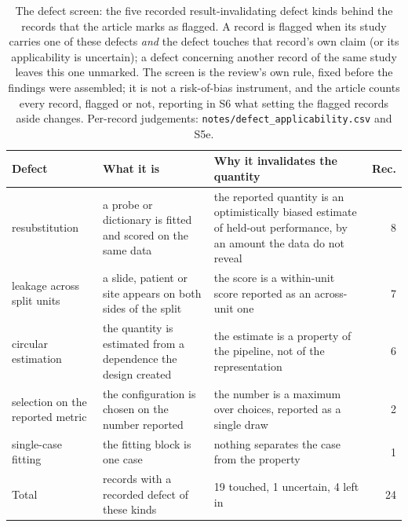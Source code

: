 \begin{table}[!t]
\centering\footnotesize\setlength\tabcolsep{3pt}\renewcommand{\arraystretch}{1.08}
\caption{The defect screen: the five recorded result-invalidating defect kinds behind the records that the article marks as flagged. A record is flagged when its study carries one of these defects \emph{and} the defect touches that record's own claim (or its applicability is uncertain); a defect concerning another record of the same study leaves this one unmarked. The screen is the review's own rule, fixed before the findings were assembled; it is not a risk-of-bias instrument, and the article counts every record, flagged or not, reporting in S6 what setting the flagged records aside changes. Per-record judgements: \texttt{notes/defect\_applicability.csv} and S5e.}
\label{tab:defects}
\begin{tabular}{@{}L{1.9cm}L{2.4cm}L{2.0cm}r@{}}
\toprule
Defect & What it is & Why it invalidates the quantity & Rec. \\
\midrule
resubstitution & a probe or dictionary is fitted and scored on the same data & the reported quantity is an optimistically biased estimate of held-out performance, by an amount the data do not reveal & 8 \\
leakage across split units & a slide, patient or site appears on both sides of the split & the score is a within-unit score reported as an across-unit one & 7 \\
circular estimation & the quantity is estimated from a dependence the design created & the estimate is a property of the pipeline, not of the representation & 6 \\
selection on the reported metric & the configuration is chosen on the number reported & the number is a maximum over choices, reported as a single draw & 2 \\
single-case fitting & the fitting block is one case & nothing separates the case from the property & 1 \\
\midrule
Total & records with a recorded defect of these kinds & 19 touched, 1 uncertain, 4 left in & 24 \\
\bottomrule
\end{tabular}
\end{table}
